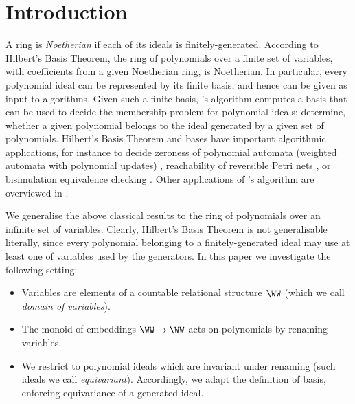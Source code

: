 
\section{Introduction}

A ring is \emph{Noetherian} if each of its ideals
is finitely-generated.
According to Hilbert's Basis Theorem,
the ring of polynomials over a finite set of variables,
with coefficients from a given Noetherian ring, is Noetherian.
In particular, every polynomial ideal can be represented by its finite basis, and hence can be given as input to algorithms.
Given such a finite basis, \Bu's algorithm computes a \Gr basis that can be used to decide
the
membership problem for polynomial ideals: determine, whether a given polynomial belongs to the
ideal generated by a given set of polynomials.
Hilbert's Basis Theorem and \Gr bases have important algorithmic applications, for instance
to decide zeroness of polynomial automata (weighted automata with
polynomial updates) \cite{Ben17},
reachability of reversible Petri nets \cite{MayrMeyer82}, or
bisimulation equivalence checking \cite{Stribrna97}.
Other applications of \Bu's algorithm are overviewed in \cite{Bu-app98}.

We generalise the above classical results to the ring of polynomials 
over an infinite set of variables.
Clearly,
Hilbert's Basis Theorem is not generalisable literally, since every polynomial belonging to 
a finitely-generated ideal may use at least one of variables used by the generators.
In this paper we investigate the following setting:
%
\begin{itemize}
\item
Variables are elements of a countable relational structure $\WW$
(which we call \emph{domain of variables}).
\item
The monoid of embeddings $\WW \to \WW$ acts on polynomials by renaming variables.
\item 
We restrict to polynomial ideals which are invariant under renaming (such ideals we call
\emph{equivariant}).
Accordingly, we adapt the definition of basis, enforcing equivariance of a generated ideal.
\end{itemize}

